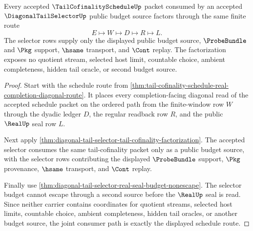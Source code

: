 \begin{theorem}
\label{thm:tail-cofinality-schedule-diagonal-tail-selector-factorization}
Every accepted $\TailCofinalityScheduleUp$ packet consumed by an accepted
$\DiagonalTailSelectorUp$ public budget source factors through the same finite
route
$$
E \longmapsto W \longmapsto D \longmapsto R \longmapsto L.
$$
The selector rows supply only the displayed public budget source,
$\ProbeBundle$ and $\Pkg$ support, $\hsame$ transport, and $\Cont$ replay.
The factorization exposes no quotient stream, selected host limit, countable
choice, ambient completeness, hidden tail oracle, or second budget source.
\end{theorem}
\begin{proof}
Start with the schedule route from
\autoref{thm:tail-cofinality-schedule-real-completion-diagonal-route}. It
places every completion-facing diagonal read of the accepted schedule packet
on the ordered path from the finite-window row $W$ through the dyadic ledger
$D$, the regular readback row $R$, and the public $\RealUp$ seal row $L$.

Next apply
\autoref{thm:diagonal-tail-selector-tail-cofinality-factorization}. The
accepted selector consumes the same tail-cofinality packet only as a public
budget source, with the selector rows contributing the displayed
$\ProbeBundle$ support, $\Pkg$ provenance, $\hsame$ transport, and $\Cont$
replay.

Finally use
\autoref{thm:diagonal-tail-selector-real-seal-budget-nonescape}. The selector
budget cannot escape through a second source before the $\RealUp$ seal is
read. Since neither carrier contains coordinates for quotient streams,
selected host limits, countable choice, ambient completeness, hidden tail
oracles, or another budget source, the joint consumer path is exactly the
displayed schedule route.
\end{proof}

